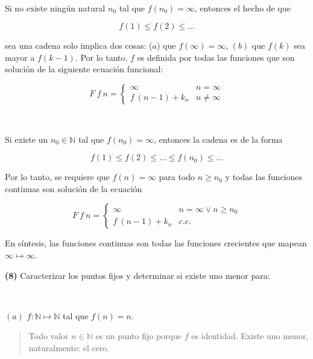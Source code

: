 \documentclass[a4paper, 12pt]{article}
\begin{document}
~ 

Si no existe ningún natural $n_0$ tal que $f(n_0) = \infty$, entonces el hecho
de que 

\begin{equation*}
  f(1) \leq f(2) \leq \ldots
\end{equation*}

sea una cadena solo implica dos cosas: ($a$) que $f(\infty) = \infty$, $(b)$ que 
$f(k)$ sea mayor a $f(k-1)$. Por lo tanto, $f$ es definida por todas las
funciones que son solución de la siguiente ecuación funcional:

\begin{equation*}
  F ~ f ~ n = \begin{cases}
    \infty & n = \infty\\ 
    f ~ (n-1) + k_n & n \neq \infty
  \end{cases}
\end{equation*}


~ 

Si existe un $n_0 \in \mathbb{N}$ tal que $f(n_0) = \infty$, entonces la cadena
es de la forma 

\begin{equation*}
  f(1) \leq f(2) \leq \ldots \leq f(n_0) \leq \ldots
\end{equation*}

Por lo tanto, se requiere que $f(n) = \infty$ para todo $n \geq n_0$ y todas las
funciones continuas son solución de la ecuación 

\begin{equation*}
  F ~ f ~ n = \begin{cases}
    \infty & n = \infty \lor  n \geq n_0\\ 
    f ~ (n-1) + k_n & c.c.
  \end{cases}
\end{equation*}

En síntesis, las funciones continuas son todas las funciones crecientes que
mapean $\infty \mapsto \infty$.


\pagebreak

\textbf{(8)} Caracterizar los puntos fijos y determinar si existe uno menor
para:

~

$(a)$ $f : \mathbb{N} \mapsto \mathbb{N}$ tal que $f(n) = n$.


\small
\begin{quote}

Todo valor $n \in \mathbb{N}$ es un punto fijo porque $f$ es identidad. Existe
uno menor, naturalmente: el cero.

\end{quote}
\normalsize
\end{document}
